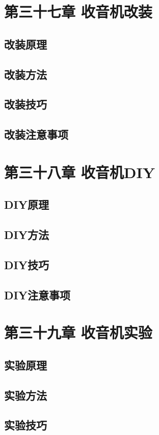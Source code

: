\documentclass[12pt,UTF8]{ctexbook}
\begin{document}
\chapter{第三十七章 收音机改装}

\section{改装原理}
\section{改装方法}
\section{改装技巧}
\section{改装注意事项}

\chapter{第三十八章 收音机DIY}

\section{DIY原理}
\section{DIY方法}
\section{DIY技巧}
\section{DIY注意事项}

\chapter{第三十九章 收音机实验}

\section{实验原理}
\section{实验方法}
\section{实验技巧}
\end{document}
